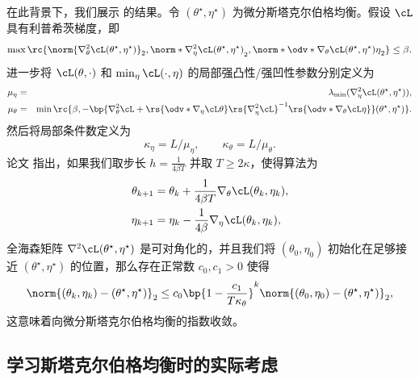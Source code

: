 \documentclass[../../book-main_zh.tex]{subfiles}
\begin{document}
在此背景下，我们展示 \cite{li2022convergence} 的结果。令 \((\theta^{\star}, \eta^{\star})\) 为微分斯塔克尔伯格均衡。假设 \(\cL\) 具有利普希茨梯度，即
\begin{equation}
    \max\rc{\norm{\nabla_{\theta}^{2}\cL(\theta^{\star},
        \eta^{\star})}_{2}, \norm*{\nabla_{\eta}^{2}\cL(\theta^{\star},
        \eta^{\star})}_{2},
        \norm*{\odv*{\nabla_{\theta}\cL(\theta^{\star},
    \eta^{\star})}{\eta}}_{2}} \leq \beta.
\end{equation}
进一步将 \(\cL(\theta, \cdot)\) 和 \(\min_{\eta}\cL(\cdot, \eta)\) 的局部强凸性/强凹性参数分别定义为
\begin{eqnarray}
    \mu_{\eta} &=& \lambda_{\min}(\nabla_{\eta}^{2}\cL(\theta^{\star},
    \eta^{\star})), \\ \mu_{\theta} &=& \min\rc{\beta,
        -\bp{\nabla_{\theta}^{2}\cL +
        \rs{\odv*{\nabla_{\eta}\cL}{\theta}}\rs{\nabla_{\eta}^{2}\cL}^{-1}\rs{\odv*{\nabla_{\theta}\cL}{\eta}}}(\theta^{\star},
    \eta^{\star})}.
\end{eqnarray}
然后将局部条件数定义为
\begin{equation}
    \kappa_{\eta} = L/\mu_{\eta}, \qquad \kappa_{\theta} = L/\mu_{\theta}.
\end{equation}
论文 \cite{li2022convergence} 指出，如果我们取步长 \(h
= \frac{1}{4\beta T}\) 并取 \(T \geq 2\kappa\)，使得算法为
\begin{align}
    \theta_{k + 1}
    &= \theta_{k} + \frac{1}{4\beta T}\nabla_{\theta} \cL(\theta_{k},
    \eta_{k}), \\
    \eta_{k + 1}
    &= \eta_{k} - \frac{1}{4\beta}\nabla_{\eta} \cL(\theta_{k}, \eta_{k}),
\end{align}
全海森矩阵 \(\nabla^{2}\cL(\theta^{\star}, \eta^{\star})\) 是可对角化的，并且我们将 \((\theta_{0}, \eta_{0})\) 初始化在足够接近 \((\theta^{\star}, \eta^{\star})\) 的位置，那么存在正常数 \(c_{0}, c_{1} > 0\) 使得
\begin{equation}
    \norm{(\theta_{k}, \eta_{k}) - (\theta^{\star},
    \eta^{\star})}_{2} \leq c_{0}\bp{1 -
    \frac{c_{1}}{T\kappa_{\theta}}}^{k}\norm{(\theta_{0}, \eta_{0}) -
    (\theta^{\star}, \eta^{\star})}_{2},
\end{equation}
这意味着向微分斯塔克尔伯格均衡的指数收敛。

\subsection{学习斯塔克尔伯格均衡时的实际考虑}
\end{document}
